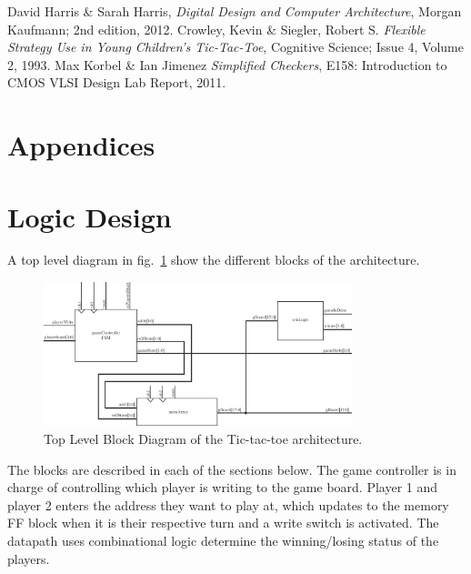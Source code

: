 \documentclass[]{article}
\begin{document}
\begin{thebibliography}{widest entry}
  David Harris \& Sarah Harris,
  \emph{Digital Design and Computer Architecture},
  Morgan Kaufmann; 2nd edition,
  2012.
 Crowley, Kevin \& Siegler, Robert S.
  \emph{Flexible Strategy Use in Young Children's Tic-Tac-Toe},
  Cognitive Science; Issue 4, Volume 2,
  1993.
 Max Korbel \& Ian Jimenez
  \emph{Simplified Checkers},
  E158: Introduction to CMOS VLSI Design Lab Report,
  2011. 

\end{thebibliography}


\section*{Appendices}
\appendix


\section{Logic Design}
A top level diagram in fig.~\ref{fig:top-level} show the different blocks of the architecture.

\begin{figure}
\centering
\includegraphics[width=0.8\textwidth]{top-level}
\caption{Top Level Block Diagram of the Tic-tac-toe architecture.}
\label{fig:top-level}
\end{figure}
The blocks are described in each of the sections below. The game controller is in charge of controlling which player is writing to the game board. Player 1 and player 2 enters the address they want to play at, which updates to the memory FF block when it is their respective turn and a write switch is activated. The datapath uses combinational logic determine the winning/losing status of the players.
\end{document}
